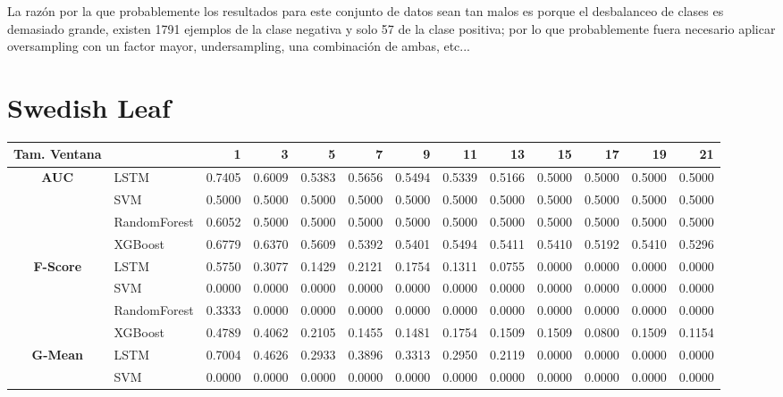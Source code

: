 La razón por la que probablemente los resultados para este conjunto de datos sean tan malos es porque el desbalanceo de clases es demasiado grande, existen 1791 ejemplos de la clase negativa y solo 57 de la clase positiva; por lo que probablemente fuera necesario aplicar oversampling con un factor mayor, undersampling, una combinación de ambas, etc...

\section{Swedish Leaf}
\begin{table}[h]
\centering
\begin{adjustbox}{max width=15cm}
	\begin{tabular}{|c|l|r|r|r|r|r|r|r|r|r|r|r|}
		\hline
		\textbf{Tam. Ventana} &         &      1  &      3  &      5  &      7  &      9  &      11 &      13 &      15 &      17 &      19 &      21 \\
		\hline
		\textbf{AUC} & LSTM &  0.7405 &  0.6009 &  0.5383 &  0.5656 &  0.5494 &  0.5339 &  0.5166 &  0.5000 &  0.5000 &  0.5000 &  0.5000 \\
		& SVM &  0.5000 &  0.5000 &  0.5000 &  0.5000 &  0.5000 &  0.5000 &  0.5000 &  0.5000 &  0.5000 &  0.5000 &  0.5000 \\
		& RandomForest &  0.6052 &  0.5000 &  0.5000 &  0.5000 &  0.5000 &  0.5000 &  0.5000 &  0.5000 &  0.5000 &  0.5000 &  0.5000 \\
		& XGBoost &  0.6779 &  0.6370 &  0.5609 &  0.5392 &  0.5401 &  0.5494 &  0.5411 &  0.5410 &  0.5192 &  0.5410 &  0.5296 \\
		\hline
		\textbf{F-Score} & LSTM &  0.5750 &  0.3077 &  0.1429 &  0.2121 &  0.1754 &  0.1311 &  0.0755 &  0.0000 &  0.0000 &  0.0000 &  0.0000 \\
		& SVM &  0.0000 &  0.0000 &  0.0000 &  0.0000 &  0.0000 &  0.0000 &  0.0000 &  0.0000 &  0.0000 &  0.0000 &  0.0000 \\
		& RandomForest &  0.3333 &  0.0000 &  0.0000 &  0.0000 &  0.0000 &  0.0000 &  0.0000 &  0.0000 &  0.0000 &  0.0000 &  0.0000 \\
		& XGBoost &  0.4789 &  0.4062 &  0.2105 &  0.1455 &  0.1481 &  0.1754 &  0.1509 &  0.1509 &  0.0800 &  0.1509 &  0.1154 \\
		\hline
		\textbf{G-Mean} & LSTM &  0.7004 &  0.4626 &  0.2933 &  0.3896 &  0.3313 &  0.2950 &  0.2119 &  0.0000 &  0.0000 &  0.0000 &  0.0000 \\
		& SVM &  0.0000 &  0.0000 &  0.0000 &  0.0000 &  0.0000 &  0.0000 &  0.0000 &  0.0000 &  0.0000 &  0.0000 &  0.0000 \\

\end{tabular}
\end{adjustbox}
\end{table}
